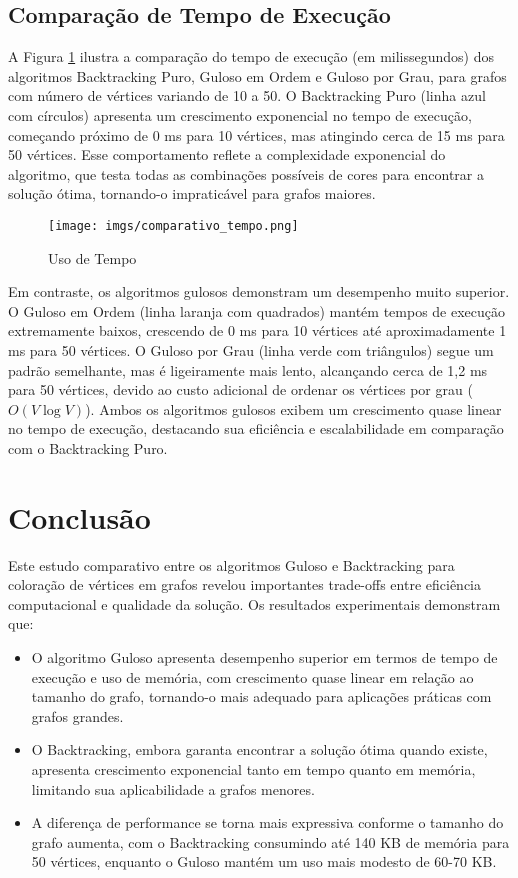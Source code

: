 \documentclass[12pt]{article}
\begin{document}
\subsection{Comparação de Tempo de Execução}

A Figura \ref{fig:temp} ilustra a comparação do tempo de execução (em milissegundos) dos algoritmos Backtracking Puro, Guloso em Ordem e Guloso por Grau, para grafos com número de vértices variando de 10 a 50. O Backtracking Puro (linha azul com círculos) apresenta um crescimento exponencial no tempo de execução, começando próximo de 0 ms para 10 vértices, mas atingindo cerca de 15 ms para 50 vértices. Esse comportamento reflete a complexidade exponencial do algoritmo, que testa todas as combinações possíveis de cores para encontrar a solução ótima, tornando-o impraticável para grafos maiores.

\begin{figure}[!htb]
    \centering
    \texttt{[image: imgs/comparativo\_tempo.png]}
    \caption{Uso de Tempo}
    \label{fig:temp}
\end{figure}


Em contraste, os algoritmos gulosos demonstram um desempenho muito superior. O Guloso em Ordem (linha laranja com quadrados) mantém tempos de execução extremamente baixos, crescendo de 0 ms para 10 vértices até aproximadamente 1 ms para 50 vértices. O Guloso por Grau (linha verde com triângulos) segue um padrão semelhante, mas é ligeiramente mais lento, alcançando cerca de 1,2 ms para 50 vértices, devido ao custo adicional de ordenar os vértices por grau (\( O(V \log V) \)). Ambos os algoritmos gulosos exibem um crescimento quase linear no tempo de execução, destacando sua eficiência e escalabilidade em comparação com o Backtracking Puro.

\section{Conclusão}

Este estudo comparativo entre os algoritmos Guloso e Backtracking para coloração de vértices em grafos revelou importantes trade-offs entre eficiência computacional e qualidade da solução. Os resultados experimentais demonstram que:

\begin{itemize}
    \item O algoritmo Guloso apresenta desempenho superior em termos de tempo de execução e uso de memória, com crescimento quase linear em relação ao tamanho do grafo, tornando-o mais adequado para aplicações práticas com grafos grandes.
    
    \item O Backtracking, embora garanta encontrar a solução ótima quando existe, apresenta crescimento exponencial tanto em tempo quanto em memória, limitando sua aplicabilidade a grafos menores.
    
    \item A diferença de performance se torna mais expressiva conforme o tamanho do grafo aumenta, com o Backtracking consumindo até 140 KB de memória para 50 vértices, enquanto o Guloso mantém um uso mais modesto de 60-70 KB.
\end{itemize}
\end{document}
